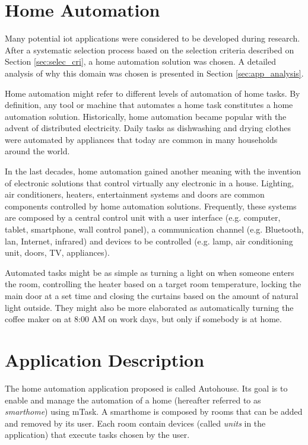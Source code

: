 \section{Home Automation}

Many potential \ac{iot} applications were considered to be developed during research. After a systematic selection process based on the selection criteria described on Section \ref{sec:selec_cri}, a home automation solution was chosen. A detailed analysis of why this domain was chosen is presented in Section \ref{sec:app_analysis}.

Home automation might refer to different levels of automation of home tasks. By definition, any tool or machine that automates a home task constitutes a home automation solution. Historically, home automation became popular with the advent of distributed electricity. Daily tasks as dishwashing and drying clothes were automated by appliances that today are common in many households around the world.

In the last decades, home automation gained another meaning with the invention of electronic solutions that control virtually any electronic in a house. Lighting, air conditioners, heaters, entertainment systems and doors are common components controlled by home automation solutions. Frequently, these systems are composed by a central control unit with a user interface (e.g. computer, tablet, smartphone, wall control panel), a communication channel (e.g. Bluetooth, \acs{lan}, Internet, infrared) and devices to be controlled (e.g. lamp, air conditioning unit, doors, TV, appliances).

Automated tasks might be as simple as turning a light on when someone enters the room, controlling the heater based on a target room temperature, locking the main door at a set time and closing the curtains based on the amount of natural light outside. They might also be more elaborated as automatically turning the coffee maker on at 8:00 AM on work days, but only if somebody is at home.

\section{Application Description}\label{sec:app_desc}

The home automation application proposed is called Autohouse. Its goal is to enable and manage the automation of a home (hereafter referred to as \textit{smarthome}) using mTask. A smarthome is composed by rooms that can be added and removed by its user. Each room contain devices (called \textit{units} in the application) that execute tasks chosen by the user. 

